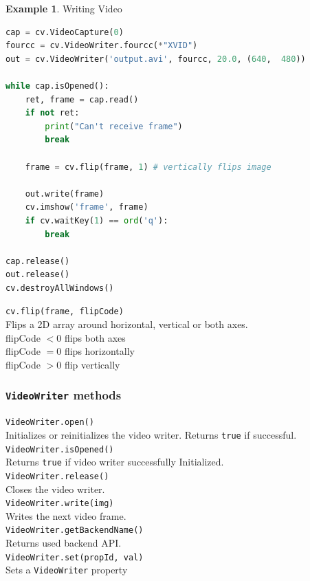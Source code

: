 \documentclass{article}
\theoremstyle{definition}
\newtheorem{ex}{Example}[subsection]
\theoremstyle{remark}
\newcommand{\func}[2]{\noindent\lstinline{#1}\\#2}
\begin{document}
\begin{ex}Writing Video
\begin{lstlisting}[language=Python]
cap = cv.VideoCapture(0)
fourcc = cv.VideoWriter.fourcc(*"XVID")
out = cv.VideoWriter('output.avi', fourcc, 20.0, (640,  480))

while cap.isOpened():
    ret, frame = cap.read()
    if not ret:
        print("Can't receive frame")
        break

    frame = cv.flip(frame, 1) # vertically flips image

    out.write(frame)
    cv.imshow('frame', frame)
    if cv.waitKey(1) == ord('q'):
        break

cap.release()
out.release()
cv.destroyAllWindows()
\end{lstlisting}
\end{ex}
   
\func{cv.flip(frame, flipCode)}{
Flips a 2D array around horizontal, vertical or both axes.\\

\noindent flipCode $ < 0 $ flips both axes \\
flipCode $ = 0 $ flips horizontally \\
flipCode $ > 0 $ flip vertically \\
}

\subsubsection{\lstinline{VideoWriter} methods}

\func{VideoWriter.open()}{
    Initializes or reinitializes the video writer. Returns \lstinline{true} if successful.\\

}

\func{VideoWriter.isOpened()}{
    Returns \lstinline{true} if video writer successfully Initialized.\\
}

\func{VideoWriter.release()}{
Closes the video writer.\\
}

\func{VideoWriter.write(img)}{
Writes the next video frame.\\
}

\func{VideoWriter.getBackendName()}{
Returns used backend API.\\
}


\func{VideoWriter.set(propId, val)}{
    Sets a \lstinline{VideoWriter} property\\
}
\end{document}
